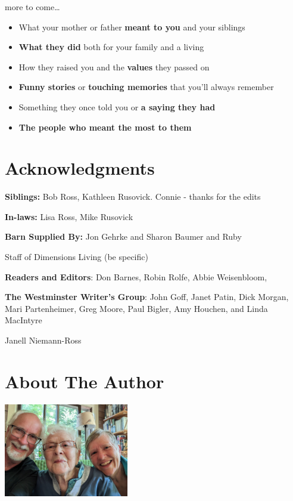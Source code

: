 \documentclass[
  letterpaper,
  DIV=11,
  numbers=noendperiod]{scrreprt}
\begin{document}
more to come\ldots{}

\begin{itemize}
\item
  What your mother or father \textbf{meant to you} and your siblings
\item
  \textbf{What they did} both for your family and a living
\item
  How they raised you and the \textbf{values} they passed on
\item
  \textbf{Funny stories} or \textbf{touching memories} that you'll
  always remember
\item
  Something they once told you or \textbf{a saying they had}
\item
  \textbf{The people who meant the most to them}
\end{itemize}


\chapter*{Acknowledgments}\label{acknowledgments}


\textbf{Siblings:} Bob Ross, Kathleen Rusovick. Connie - thanks for the
edits

\textbf{In-laws:} Lisa Ross, Mike Rusovick

\textbf{Barn Supplied By:} Jon Gehrke and Sharon Baumer and Ruby

Staff of Dimensions Living (be specific)

\textbf{Readers and Editors}: Don Barnes, Robin Rolfe, Abbie
Weisenbloom,

\textbf{The Westminster Writer's Group}: John Goff, Janet Patin, Dick
Morgan, Mari Partenheimer, Greg Moore, Paul Bigler, Amy Houchen, and
Linda MacIntyre

Janell Niemann-Ross


\chapter*{About The Author}\label{about-the-author}


\includegraphics[width=2.14583in,height=\textheight]{AuthorPhoto.jpg}
\end{document}
